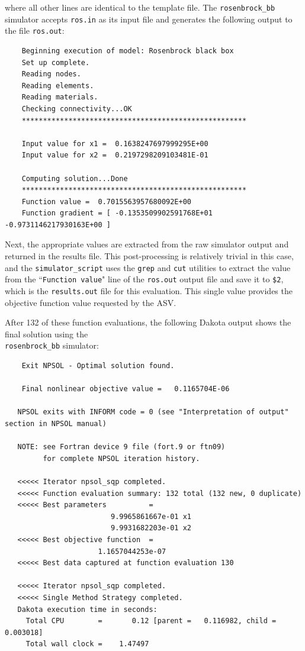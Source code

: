 where all other lines are identical to the template file. The
\texttt{rosenbrock\_bb} simulator accepts \texttt{ros.in} as its input
file and generates the following output to the file \texttt{ros.out}:
\begin{small}
\begin{verbatim}
    Beginning execution of model: Rosenbrock black box
    Set up complete.
    Reading nodes.
    Reading elements.
    Reading materials.
    Checking connectivity...OK
    *****************************************************

    Input value for x1 =  0.1638247697999295E+00
    Input value for x2 =  0.2197298209103481E-01

    Computing solution...Done
    *****************************************************
    Function value =  0.7015563957680092E+00
    Function gradient = [ -0.1353509902591768E+01 -0.9731146217930163E+00 ]
\end{verbatim}
\end{small}

Next, the appropriate values are extracted from the raw simulator output
and returned in the results file. This post-processing is relatively
trivial in this case, and the \texttt{simulator\_script} uses the
\texttt{grep} and \texttt{cut} utilities to extract the value from the
``\texttt{Function value}" line of the \texttt{ros.out} output file and save it to
\texttt{\$2}, which is the \texttt{results.out} file for this
evaluation. This single value provides the objective function value
requested by the ASV.

After 132 of these function evaluations, the following Dakota output
shows the final solution using the \\ \texttt{rosenbrock\_bb} simulator:
\begin{small}
\begin{verbatim}
    Exit NPSOL - Optimal solution found.

    Final nonlinear objective value =   0.1165704E-06

   NPSOL exits with INFORM code = 0 (see "Interpretation of output" section in NPSOL manual)

   NOTE: see Fortran device 9 file (fort.9 or ftn09)
         for complete NPSOL iteration history.

   <<<<< Iterator npsol_sqp completed.
   <<<<< Function evaluation summary: 132 total (132 new, 0 duplicate)
   <<<<< Best parameters          =
                         9.9965861667e-01 x1
                         9.9931682203e-01 x2
   <<<<< Best objective function  =
                      1.1657044253e-07
   <<<<< Best data captured at function evaluation 130

   <<<<< Iterator npsol_sqp completed.
   <<<<< Single Method Strategy completed.
   Dakota execution time in seconds:
     Total CPU        =       0.12 [parent =   0.116982, child =   0.003018]
     Total wall clock =    1.47497
\end{verbatim}
\end{small}

